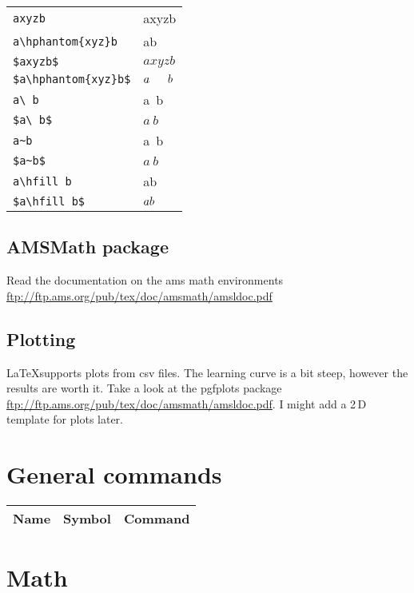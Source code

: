 \documentclass[10pt,letterpaper,oneside]{article}
\begin{document}
\begin{table}[H]
\begin{supertabular}{lp{5cm}}
    \verb|axyzb| & axyzb \\
    \verb|a\hphantom{xyz}b| & a\hphantom{xyz}b \\
    \verb|$axyzb$| & $axyzb$ \\
    \verb|$a\hphantom{xyz}b$| & $a\hphantom{xyz}b$ \\
    \verb|a\ b| & a\ b \\
    \verb|$a\ b$| & $a\ b$ \\
    \verb|a~b| & a~b \\
    \verb|$a~b$| & $a~b$ \\
    \verb|a\hfill b| & a\hfill b \\
    \verb|$a\hfill b$| & $a\hfill b$ \\
  \end{supertabular}
\end{table}

\subsection{AMSMath package}
Read the documentation on the ams math environments \url{ftp://ftp.ams.org/pub/tex/doc/amsmath/amsldoc.pdf}

\subsection{Plotting}
\LaTeX supports plots from csv files. The learning curve is a bit steep, however the results are worth it. Take a look at the pgfplots package \url{ftp://ftp.ams.org/pub/tex/doc/amsmath/amsldoc.pdf}. I might add a 2\,D template for plots later.

\renewcommand{\arraystretch}{2}

\section{General commands}
\begin{supertabular}{p{0.4\textwidth}|p{0.3\textwidth}|p{0.3\textwidth}}
  Name & Symbol & Command \\ \hline
\end{supertabular}

\section{Math}
\end{document}
